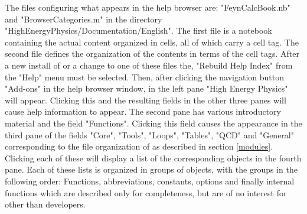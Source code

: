 The files configuring what appears in the help browser are: "FeynCalcBook.nb" and "BrowserCategories.m" in the directory "HighEnergyPhysics/Documentation/English". The first file is a notebook containing the actual content organized in cells, all of which carry a cell tag. The second file defines the organization of the contents in terms of the cell tags. After a new install of \fc or a change to one of these files the, "Rebuild Help Index" from the "Help" menu must be selected. Then, after clicking the navigation button "Add-ons" in the help browser window, in the left pane "High Energy Physics" will appear. Clicking this and the resulting fields in the other three panes will cause \fc help information to appear. The second pane has various introductory material and the field "Functions". Clicking this field causes the appearance in the third pane of the fields "Core", "Tools", "Loops", "Tables", "QCD" and "General" corresponding to the file organization of \fc as described in section \ref{modules}. Clicking each of these will display a list of the corresponding objects in the fourth pane. Each of these lists is organized in groups of objects, with the groups in the following order: Functions, abbreviations, constants, options and finally internal functions which are described only for completeness, but are of no interest for other than developers.

